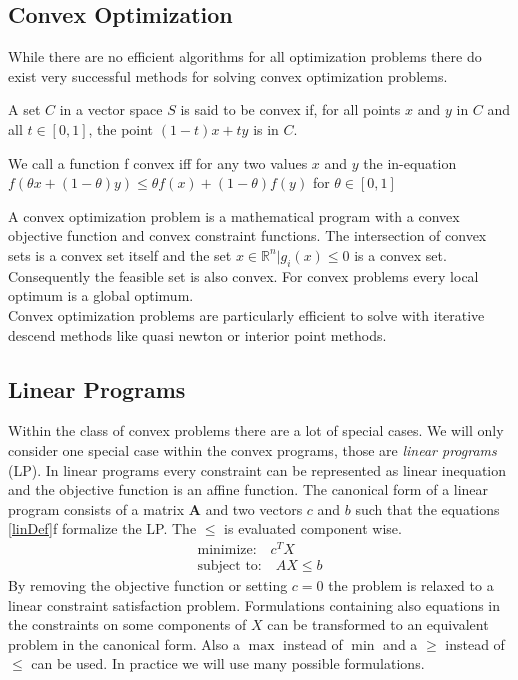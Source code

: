 \subsection{Convex Optimization}
While there are no efficient algorithms for all optimization problems there do exist very successful methods for solving convex optimization problems\cite{Boyd04ConOpt}.
\begin{definition}
A set $C$ in a vector space $S$ is said to be convex if, for all points $x$ and $y$ in $C$ and all $t\in\left[0,1\right]$, the point $(1-t)x+ty$ is in $C$.
\end{definition}
\begin{definition}
We call a function f convex iff for any two values $x$ and $y$ the in-equation $ f(\theta x + (1-\theta) y)\leq \theta f(x)+(1-\theta) f(y)$ for $\theta\in \left[0,1\right] $
\end{definition}
A convex optimization problem is a mathematical program with a convex objective function and convex constraint functions. The intersection of convex sets is a convex set itself and the set ${x\in\mathbb{R}^n|g_i(x)\leq 0}$ is a convex set. Consequently the feasible set is also convex. For convex problems every local optimum is a global optimum.\\
Convex optimization problems are particularly efficient to solve with iterative descend methods like quasi newton or interior point methods.
\subsection{Linear Programs}
Within the class of convex problems there are a lot of special cases. We will only consider one special case within the convex programs, those are \emph{linear programs} (LP).
In linear programs every constraint can be represented as linear inequation and the objective function is an affine function. 
The canonical form of a linear program consists of a matrix $\mathbf{A}$ and two vectors ${c}$ and ${b}$ such that the equations \ref{linDef}f formalize the LP. The $\leq$ is evaluated component wise.
\begin{eqnarray}
\label{linDef}
\text{minimize:}\quad {c}^TX \\
\text{subject to:}\quad AX\leq{b}
\end{eqnarray}
By removing the objective function or setting ${c}={0}$ the problem is relaxed to a linear constraint satisfaction problem. Formulations containing also equations in the constraints on some components of $X$ can be transformed to an equivalent problem in the canonical form. Also a $\max$ instead of $\min$ and a $\geq$ instead of $\leq$ can be used. In practice we will use many possible formulations.\\

